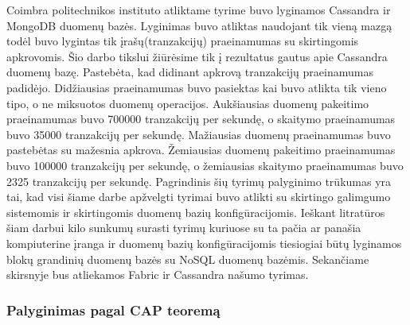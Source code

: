 \documentclass{VUMIFPSkursinis}
\begin{document}
			Coimbra politechnikos instituto atliktame tyrime \cite{MonCas} buvo lyginamos Cassandra ir MongoDB duomenų bazės. 
Lyginimas buvo atliktas naudojant tik vieną mazgą todėl buvo lygintas tik įrašų(tranzakcijų) praeinamumas su skirtingomis apkrovomis. 
Šio darbo tikslui žiūrėsime tik į rezultatus gautus apie Cassandra duomenų bazę. Pastebėta, kad didinant apkrovą tranzakcijų praeinamumas padidėjo. 
Didžiausias praeinamumas buvo pasiektas kai buvo atlikta tik vieno tipo, o ne miksuotos duomenų operacijos.
Aukšiausias duomenų pakeitimo praeinamumas buvo 700000 tranzakcijų per sekundę, o skaitymo praeinamumas buvo 35000 tranzakcijų per sekundę.
Mažiausias duomenų praeinamumas buvo pastebėtas su mažesnia apkrova.
Žemiausias duomenų pakeitimo praeinamumas buvo 100000 tranzakcijų per sekundę, o žemiausias skaitymo praeinamumas buvo 2325 tranzakcijų per sekundę.
\newline
Pagrindinis šių tyrimų palyginimo trūkumas yra tai, kad visi šiame darbe apžvelgti tyrimai buvo atlikti su skirtingo galimgumo sistemomis ir skirtingomis duomenų bazių konfigūracijomis. 
Ieškant litratūros šiam darbui kilo sunkumų surasti tyrimų kuriuose su ta pačia ar panašia kompiuterine įranga ir duomenų bazių konfigūracijomis tiesiogiai būtų lyginamos blokų grandinių duomenų bazės su NoSQL duomenų bazėmis. Sekančiame skirsnyje bus atliekamos Fabric ir Cassandra našumo tyrimas.
	
	\subsubsection{Palyginimas pagal CAP teoremą}
\end{document}
